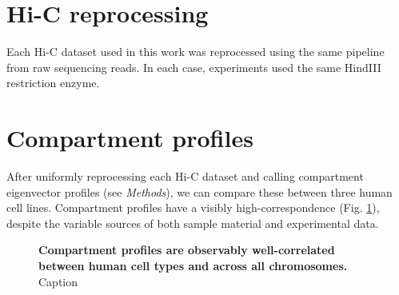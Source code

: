 \documentclass[a4paper,10pt,oneside]{book}
\begin{document}

\section{Hi-C reprocessing}

Each Hi-C dataset used in this work was reprocessed using the same pipeline from raw sequencing reads. In each case, experiments used the same HindIII restriction enzyme.



\section{Compartment profiles}

After uniformly reprocessing each Hi-C dataset and calling compartment eigenvector profiles (see \emph{Methods}), we can compare these between three human cell lines. Compartment profiles have a visibly high-correspondence (Fig. \ref{fig:wiggles}), despite the variable sources of both sample material and experimental data.

\begin{figure}
\begin{center}
\captionsetup{width=\textwidth}
\caption{
{\bf Compartment profiles are observably well-correlated between human cell types and across all chromosomes.}
Caption
}\label{fig:wiggles}
\end{center}
\end{figure} 
\end{document}
